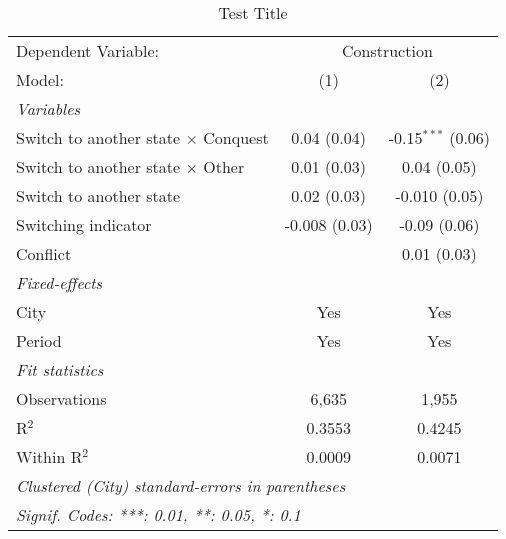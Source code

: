 \begin{table}[htbp]
   \caption{\label{tab:baseline_50y} Test Title}
   \centering
   \begin{tabular}{lcc}
      \tabularnewline \midrule \midrule
      Dependent Variable: & \multicolumn{2}{c}{Construction}\\
      Model:                                     & (1)           & (2)\\  
      \midrule
      \emph{Variables}\\
      Switch to another state $\times$ Conquest  & 0.04 (0.04)   & -0.15$^{***}$ (0.06)\\   
      Switch to another state $\times$ Other     & 0.01 (0.03)   & 0.04 (0.05)\\   
      Switch to another state                    & 0.02 (0.03)   & -0.010 (0.05)\\   
      Switching indicator                        & -0.008 (0.03) & -0.09 (0.06)\\   
      Conflict                                   &               & 0.01 (0.03)\\   
      \midrule
      \emph{Fixed-effects}\\
      City                                       & Yes           & Yes\\  
      Period                                     & Yes           & Yes\\  
      \midrule
      \emph{Fit statistics}\\
      Observations                               & 6,635         & 1,955\\  
      R$^2$                                      & 0.3553        & 0.4245\\  
      Within R$^2$                               & 0.0009        & 0.0071\\  
      \midrule \midrule
      \multicolumn{3}{l}{\emph{Clustered (City) standard-errors in parentheses}}\\
      \multicolumn{3}{l}{\emph{Signif. Codes: ***: 0.01, **: 0.05, *: 0.1}}\\
   \end{tabular}
\end{table}
